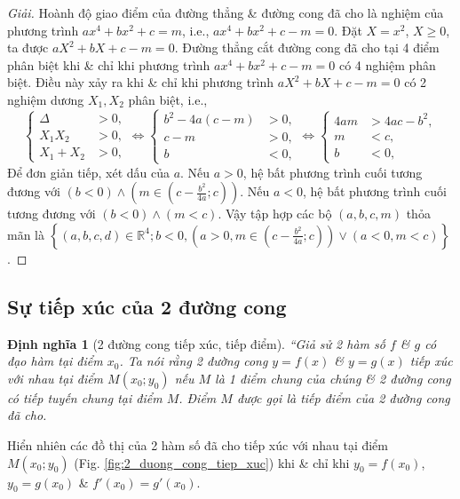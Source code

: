 \documentclass[oneside]{book}
\numberwithin{equation}{section}
\newtheorem{dinhnghia}{Định nghĩa}[section]
\begin{document}
\begin{proof}[Giải]
	Hoành độ giao điểm của đường thẳng \& đường cong đã cho là nghiệm của phương trình $ax^4 + bx^2 + c = m$, i.e., $ax^4 + bx^2 + c - m = 0$. Đặt $X = x^2$, $X\ge 0$, ta được $aX^2 + bX + c - m = 0$. Đường thẳng cắt đường cong đã cho tại 4 điểm phân biệt khi \& chỉ khi phương trình $ax^4 + bx^2 + c - m = 0$ có 4 nghiệm phân biệt. Điều này xảy ra khi \& chỉ khi phương trình $aX^2 + bX + c - m = 0$  có 2 nghiệm dương $X_1,X_2$ phân biệt, i.e.,
	\begin{equation*}
		\left\{\begin{split}
			\Delta &> 0,\\
			X_1X_2 &> 0,\\
			X_1 + X_2 &> 0,
		\end{split}\right.\Leftrightarrow\left\{\begin{split}
			b^2 - 4a(c - m) &> 0,\\
			c - m &> 0,\\
			b &< 0,
		\end{split}\right.\Leftrightarrow\left\{\begin{split}
		4am &> 4ac - b^2,\\
		m &< c,\\
		b &< 0,
	\end{split}\right.
	\end{equation*}
	Để đơn giản tiếp, xét dấu của $a$. Nếu $a > 0$, hệ bất phương trình cuối tương đương với $(b < 0)\land\left(m\in\left(c - \frac{b^2}{4a};c\right)\right)$. Nếu $a < 0$, hệ bất phương trình cuối tương đương với $(b < 0)\land(m < c)$. Vậy tập hợp các bộ $(a,b,c,m)$ thỏa mãn là $\left\{(a,b,c,d)\in\mathbb{R}^4;b < 0,\left(a > 0,m\in\left(c - \frac{b^2}{4a};c\right)\right)\lor(a < 0,m < c)\right\}$.
\end{proof}

\subsection{Sự tiếp xúc của 2 đường cong}

\begin{dinhnghia}[2 đường cong tiếp xúc, tiếp điểm]
	``Giả sử 2 hàm số $f$ \& $g$ có đạo hàm tại điểm $x_0$. Ta nói rằng 2 đường cong $y = f(x)$ \& $y = g(x)$ \emph{tiếp xúc} với nhau tại điểm $M(x_0;y_0)$ nếu $M$ là 1 điểm chung của chúng \& 2 đường cong có tiếp tuyến chung tại điểm $M$. Điểm $M$ được gọi là \emph{tiếp điểm} của 2 đường cong đã cho.
\end{dinhnghia}
Hiển nhiên các đồ thị của 2 hàm số đã cho tiếp xúc với nhau tại điểm $M(x_0;y_0)$ (Fig. \ref{fig:2_duong_cong_tiep_xuc}) khi \& chỉ khi $y_0 = f(x_0)$, $y_0 = g(x_0)$ \& $f'(x_0) = g'(x_0)$.
\end{document}

